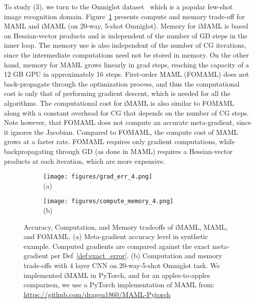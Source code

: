 \documentclass{article} \usepackage[nonatbib, final]{mod_neurips}
\begin{document}
To study (3), we turn to the Omniglot dataset~\cite{omniglot} which is a popular few-shot image recognition domain. 
Figure~\ref{fig:experiments} presents compute and memory trade-off for MAML and iMAML (on 20-way, 5-shot Omniglot). Memory for iMAML is based on Hessian-vector products and is independent of the number of GD steps in the inner loop. The memory use is also independent of the number of CG iterations, since the intermediate computations need not be stored in memory. On the other hand, memory for MAML grows linearly in grad steps, reaching the capacity of a 12 GB GPU in approximately 16 steps. First-order MAML (FOMAML) does not back-propagate through the optimization process, and thus the computational cost is only that of performing gradient descent, which is needed for all the algorithms. 
The computational cost for iMAML is also similar to FOMAML along with a constant overhead for CG that depends on the number of CG steps. Note however, that FOMAML does not compute an accurate meta-gradient, since it ignores the Jacobian. Compared to FOMAML, the compute cost of MAML grows at a faster rate. FOMAML requires only gradient computations, while backpropagating through GD (as done in MAML) requires a Hessian-vector products at each iteration, which are more expensive.


\begin{figure}[b!]
    \centering
    \begin{subfigure}[b]{0.3\textwidth}
         \centering
         \texttt{[image: figures/grad\_err\_4.png]} \\
         (a)
    \end{subfigure}
    \hspace*{10pt}
    \begin{subfigure}[b]{0.63\textwidth}
         \centering
         \texttt{[image: figures/compute\_memory\_4.png]} \\
         (b)
    \end{subfigure}
    \caption{\footnotesize Accuracy, Computation, and Memory tradeoffs of iMAML, MAML, and FOMAML. (a) Meta-gradient accuracy level in synthetic example. Computed gradients are compared against the exact meta-gradient per Def~\ref{def:exact_error}. (b) Computation and memory trade-offs with 4 layer CNN on 20-way-5-shot Omniglot task. We implemented iMAML in PyTorch, and for an apples-to-apples comparison, we use a PyTorch implementation of MAML from: \url{https://github.com/dragen1860/MAML-Pytorch}}
    \label{fig:experiments}
\end{figure}
\end{document}

